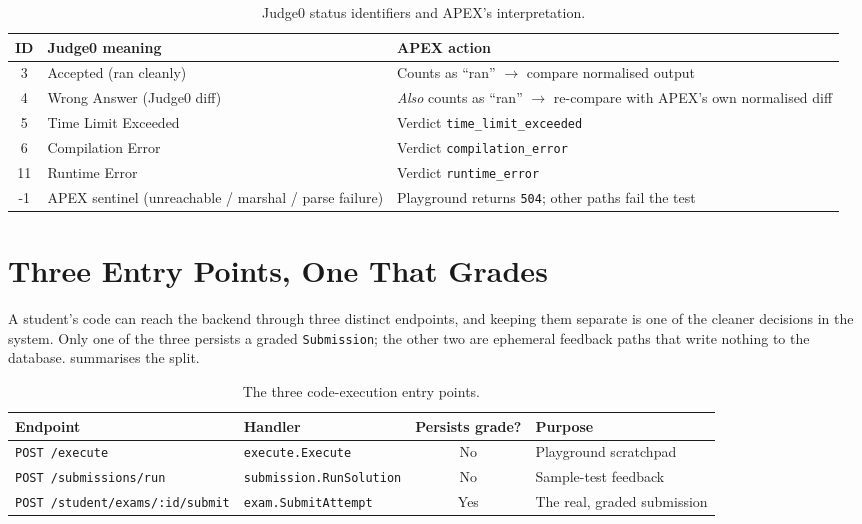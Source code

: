 \begin{table}[htbp]
\centering
\caption{Judge0 status identifiers and APEX's interpretation.}
\label{tab:grading-status}
\begin{tabular}{@{}cL{5.2cm}L{4.6cm}@{}}
\toprule
\textbf{ID} & \textbf{Judge0 meaning} & \textbf{APEX action} \\
  & Accepted (ran cleanly)      & Counts as ``ran'' $\rightarrow$ compare normalised output \\
4  & Wrong Answer (Judge0 diff)  & \emph{Also} counts as ``ran'' $\rightarrow$ re-compare with APEX's own normalised diff \\
5  & Time Limit Exceeded         & Verdict \texttt{time\_limit\_exceeded} \\
6  & Compilation Error           & Verdict \texttt{compilation\_error} \\
11 & Runtime Error               & Verdict \texttt{runtime\_error} \\
-1 & APEX sentinel (unreachable / marshal / parse failure) & Playground returns \texttt{504}; other paths fail the test \\
\bottomrule
\end{tabular}
\end{table}

\section{Three Entry Points, One That Grades}\label{sec:grading-entrypoints}

A student's code can reach the backend through three distinct endpoints, and keeping them
separate is one of the cleaner decisions in the system. Only one of the three persists a
graded \texttt{Submission}; the other two are ephemeral feedback paths that write nothing to
the database.  summarises the split.

\begin{table}[htbp]
\centering
\caption{The three code-execution entry points.}
\label{tab:grading-entrypoints}
\begin{tabular}{@{}L{4.6cm}L{4.4cm}cL{3.4cm}@{}}
\toprule
\textbf{Endpoint} & \textbf{Handler} & \textbf{Persists grade?} & \textbf{Purpose} \\
\midrule
\texttt{POST /execute}                & \texttt{execute.Execute}      & No  & Playground scratchpad \\
\texttt{POST /submissions/run}        & \texttt{submission.RunSolution} & No & Sample-test feedback \\
\texttt{POST /student/exams/:id/submit} & \texttt{exam.SubmitAttempt}   & Yes & The real, graded submission \\
\bottomrule
\end{tabular}
\end{table}


